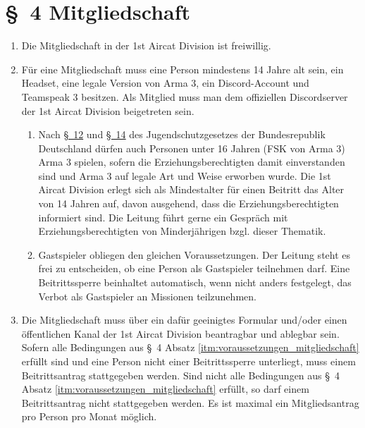 \section*{\S~4 Mitgliedschaft} 
\label{sec:mitgliedschaft}

\begin{enumerate}[label=(\arabic*)]
	\item Die Mitgliedschaft in der 1st Aircat Division ist freiwillig. 
    	\item\label{itm:voraussetzungen_mitgliedschaft} Für eine Mitgliedschaft muss eine Person mindestens 14 Jahre alt sein, ein Headset, eine legale Version von Arma 3, ein Discord-Account und Teamspeak 3 besitzen. Als Mitglied muss man dem offiziellen Discordserver der 1st Aircat Division beigetreten sein. 
    \begin{enumerate}[label=(\Alph*)]
        \item Nach \href{https://www.gesetze-im-internet.de/juschg/__12.html}{\S~12} und \href{https://www.gesetze-im-internet.de/juschg/__14.html}{\S~14} des Jugendschutzgesetzes der Bundesrepublik Deutschland dürfen auch Personen unter 16 Jahren (FSK von Arma 3) Arma 3 spielen, sofern die Erziehungsberechtigten damit einverstanden sind und Arma 3 auf legale Art und Weise erworben wurde. Die 1st Aircat Division erlegt sich als Mindestalter für einen Beitritt das Alter von 14 Jahren auf, davon ausgehend, dass die Erziehungsberechtigten informiert sind. Die Leitung führt gerne ein Gespräch mit Erziehungsberechtigten von Minderjährigen bzgl. dieser Thematik.        
        \item Gastspieler obliegen den gleichen Voraussetzungen. Der Leitung steht es frei zu entscheiden, ob eine Person als Gastspieler teilnehmen darf. Eine Beitrittssperre beinhaltet automatisch, wenn nicht anders festgelegt, das Verbot als Gastspieler an Missionen teilzunehmen.
    \end{enumerate}
    \item Die Mitgliedschaft muss über ein dafür geeinigtes Formular und/oder einen öffentlichen Kanal der 1st Aircat Division beantragbar und ablegbar sein. Sofern alle Bedingungen aus \S~4 Absatz \ref{itm:voraussetzungen_mitgliedschaft} erfüllt sind und eine Person nicht einer Beitrittssperre unterliegt, muss einem Beitrittsantrag stattgegeben werden. Sind nicht alle Bedingungen aus \S~4 Absatz \ref{itm:voraussetzungen_mitgliedschaft} erfüllt, so darf einem Beitrittsantrag nicht stattgegeben werden. Es ist maximal ein Mitgliedsantrag pro Person pro Monat möglich.    

\end{enumerate}
